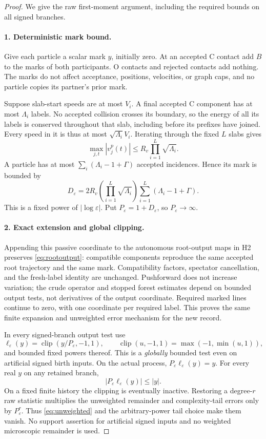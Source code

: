 \documentclass[11pt,letterpaper]{article}
\numberwithin{equation}{section}
\theoremstyle{definition}\newtheorem{assumption}[theorem]{Assumption}
\theoremstyle{remark}\newtheorem{remark}[theorem]{Remark}
\newcommand{\eps}{\varepsilon}\newcommand{\dd}{\,\mathrm d}
\newcommand{\clip}{\operatorname{clip}}\newcommand{\lab}[1]{\texttt{\detokenize{#1}}}
\begin{document}
\begin{proof}
We give the raw first-moment argument, including the required bounds on all signed branches.

\paragraph{1. Deterministic mark bound.}
Give each particle a scalar mark $y$, initially zero. At an accepted C contact add $B$ to the marks of both participants. O contacts and rejected contacts add nothing. The marks do not affect acceptance, positions, velocities, or graph caps, and no particle copies its partner's prior mark.

Suppose slab-start speeds are at most $V_i$. A final accepted C component has at most $\Lambda_i$ labels. No accepted collision crosses its boundary, so the energy of all its labels is conserved throughout that slab, including before its prefixes have joined. Every speed in it is thus at most $\sqrt{\Lambda_i}V_i$. Iterating through the fixed $L$ slabs gives
\[
 \max_{j,t}|v_j^p(t)|\le R_v\prod_{i=1}^L\sqrt{\Lambda_i}.
\]
A particle has at most $\sum_i(\Lambda_i-1+\Gamma)$ accepted incidences. Hence its mark is bounded by
\begin{equation}\label{eq:mark-bound}
 D_\eps=2R_v\left(\prod_{i=1}^L\sqrt{\Lambda_i}\right)
                      \sum_{i=1}^L(\Lambda_i-1+\Gamma).
\end{equation}
This is a fixed power of $|\log\eps|$. Put $P_\eps=1+D_\eps$, so $P_\eps\to\infty$.

\paragraph{2. Exact extension and global clipping.}
Appending this passive coordinate to the autonomous root-output maps in H2 preserves \eqref{eq:rootoutput}: compatible components reproduce the same accepted root trajectory and the same mark. Compatibility factors, spectator cancellation, and the fresh-label identity are unchanged. Pushforward does not increase variation; the crude operator and stopped forest estimates depend on bounded output tests, not derivatives of the output coordinate. Required marked lines continue to zero, with one coordinate per required label. This proves the same finite expansion and unweighted error mechanism for the new record.

In every signed-branch output test use
\begin{equation}\label{eq:clip}
 \ell_\eps(y)=\clip(y/P_\eps,-1,1),\qquad
          \clip(u,-1,1)=\max(-1,\min(u,1)),
\end{equation}
and bounded fixed powers thereof. This is a \emph{globally} bounded test even on artificial signed birth inputs. On the actual process, $P_\eps\ell_\eps(y)=y$. For every real $y$ on any retained branch,
\[
 |P_\eps\ell_\eps(y)|\le|y|.
\]
On a fixed finite history the clipping is eventually inactive. Restoring a degree-$r$ raw statistic multiplies the unweighted remainder and complexity-tail errors only by $P_\eps^r$. Thus \eqref{eq:unweighted} and the arbitrary-power tail choice make them vanish. No support assertion for artificial signed inputs and no weighted microscopic remainder is used.


\end{proof}
\end{document}
